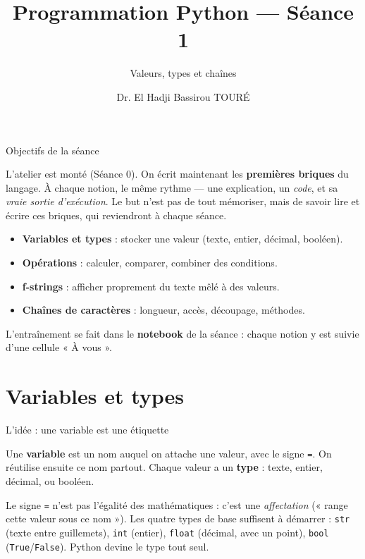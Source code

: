 \documentclass[aspectratio=169,11pt]{beamer}
\title{Programmation Python — Séance 1}
\subtitle{Valeurs, types et chaînes}
\author{Dr. El Hadji Bassirou TOURÉ}
\institute{Département de Mathématiques et Informatique\\ Faculté des Sciences et Techniques\\ Université Cheikh Anta Diop de Dakar}
\date{}
\begin{document}
\begin{frame}\titlepage\end{frame}

\begin{frame}{Objectifs de la séance}
\begin{ucaddef}[Contenu]
{\small L'atelier est monté (Séance 0). On écrit maintenant les \textbf{premières briques} du langage. À chaque notion, le même rythme — une explication, un \emph{code}, et sa \emph{vraie sortie d'exécution}. Le but n'est pas de tout mémoriser, mais de savoir lire et écrire ces briques, qui reviendront à chaque séance.}
\end{ucaddef}
\begin{itemize}\small
  \item \textbf{Variables et types} : stocker une valeur (texte, entier, décimal, booléen).
  \item \textbf{Opérations} : calculer, comparer, combiner des conditions.
  \item \textbf{f-strings} : afficher proprement du texte mêlé à des valeurs.
  \item \textbf{Chaînes de caractères} : longueur, accès, découpage, méthodes.
\end{itemize}
{\small L'entraînement se fait dans le \textbf{notebook} de la séance : chaque notion y est suivie d'une cellule « À vous ».}
\end{frame}

\section{Variables et types}

\begin{frame}{L'idée : une variable est une étiquette}
\begin{ucaddef}
{\small Une \textbf{variable} est un nom auquel on attache une valeur, avec le signe \texttt{=}. On réutilise ensuite ce nom partout. Chaque valeur a un \textbf{type} : texte, entier, décimal, ou booléen.}
\end{ucaddef}
{\small Le signe \texttt{=} n'est pas l'égalité des mathématiques : c'est une \emph{affectation} (« range cette valeur sous ce nom »). Les quatre types de base suffisent à démarrer : \texttt{str} (texte entre guillemets), \texttt{int} (entier), \texttt{float} (décimal, avec un point), \texttt{bool} (\texttt{True}/\texttt{False}). Python devine le type tout seul.}
\end{frame}
\end{document}
